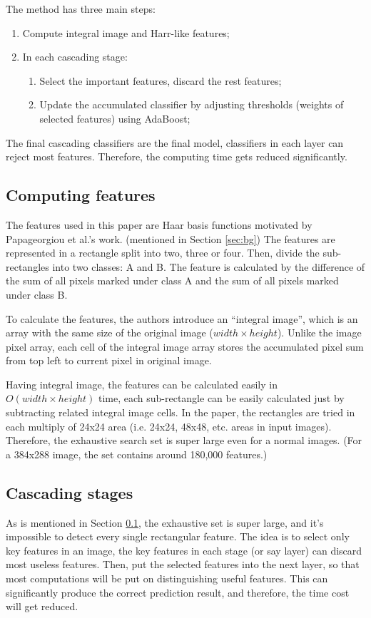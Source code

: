 \documentclass[10pt,twocolumn,letterpaper]{article}
\begin{document}
The method has three main steps:
\begin{enumerate}
    \item Compute integral image and Harr-like features;
    \item In each cascading stage:
          \begin{enumerate}
              \item Select the important features, discard the rest features;
              \item Update the accumulated classifier by adjusting thresholds (weights of selected features) using AdaBoost;
          \end{enumerate}
\end{enumerate}

The final cascading classifiers are the final model, classifiers in each layer can reject most features.
Therefore, the computing time gets reduced significantly.

\subsection{Computing features} \label{sec:cf}
The features used in this paper are Haar basis functions motivated by Papageorgiou et al.'s work. (mentioned in Section \ref{sec:bg})
The features are represented in a rectangle split into two, three or four. Then, divide the sub-rectangles into two classes: A and B.
The feature is calculated by the difference of the sum of all pixels marked under class A and the sum of all pixels marked under class B.

To calculate the features, the authors introduce an ``integral image'', which is an array with the same size of the original image ($width \times height$).
Unlike the image pixel array, each cell of the integral image array stores the accumulated pixel sum from top left to current pixel in original image.

Having integral image, the features can be calculated easily in $O(width \times height)$ time,
each sub-rectangle can be easily calculated just by subtracting related integral image cells.
In the paper, the rectangles are tried in each multiply of 24x24 area (i.e. 24x24, 48x48, etc. areas in input images).
Therefore, the exhaustive search set is super large even for a normal images. (For a 384x288 image, the set contains around 180,000 features.)

\subsection{Cascading stages}
As is mentioned in Section \ref{sec:cf}, the exhaustive set is super large, and it's impossible to detect every single rectangular feature.
The idea is to select only key features in an image, the key features in each stage (or say layer) can discard most useless features.
Then, put the selected features into the next layer, so that most computations will be put on distinguishing useful features.
This can significantly produce the correct prediction result, and therefore, the time cost will get reduced.
\end{document}
